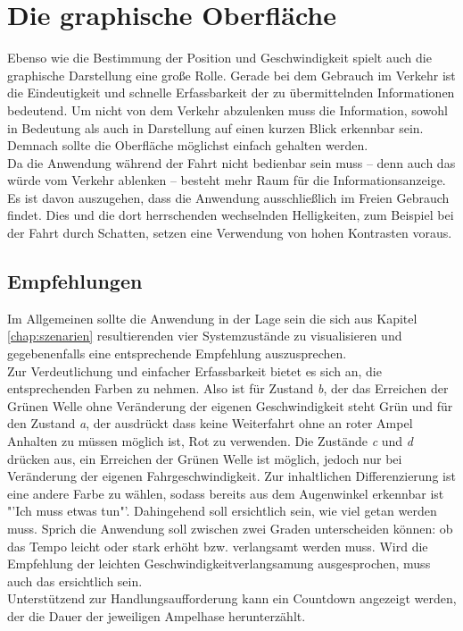 \section{Die graphische Oberfläche}
Ebenso wie die Bestimmung der Position und Geschwindigkeit spielt auch die graphische Darstellung eine große Rolle. Gerade bei dem Gebrauch im Verkehr ist die Eindeutigkeit und schnelle Erfassbarkeit der zu übermittelnden Informationen bedeutend. Um nicht von dem Verkehr abzulenken muss die Information, sowohl in Bedeutung als auch in Darstellung auf einen kurzen Blick erkennbar sein. Demnach sollte die Oberfläche möglichst einfach gehalten werden.\\
Da die Anwendung während der Fahrt nicht bedienbar sein muss -- denn auch das würde vom Verkehr ablenken -- besteht mehr Raum für die Informationsanzeige. 
Es ist davon auszugehen, dass die Anwendung ausschließlich im Freien Gebrauch findet. Dies und die dort herrschenden wechselnden Helligkeiten, zum Beispiel bei der Fahrt durch Schatten, setzen eine Verwendung von hohen Kontrasten voraus.
\subsection{Empfehlungen}
Im Allgemeinen sollte die Anwendung in der Lage sein die sich aus Kapitel \ref{chap:szenarien} resultierenden vier Systemzustände zu visualisieren und gegebenenfalls eine entsprechende Empfehlung auszusprechen.\\
Zur Verdeutlichung und einfacher Erfassbarkeit bietet es sich an, die entsprechenden Farben zu nehmen. Also ist für Zustand \textit{b}, der das Erreichen der Grünen Welle ohne Veränderung der eigenen Geschwindigkeit steht Grün und für den Zustand \textit{a}, der ausdrückt dass keine Weiterfahrt ohne an roter Ampel Anhalten zu müssen möglich ist, Rot zu verwenden.
Die Zustände \textit{c} und \textit{d} drücken aus, ein Erreichen der Grünen Welle ist möglich, jedoch nur bei Veränderung der eigenen Fahrgeschwindigkeit. Zur inhaltlichen Differenzierung ist eine andere Farbe zu wählen, sodass bereits aus dem Augenwinkel erkennbar ist "'Ich muss etwas tun"'. Dahingehend soll ersichtlich sein, wie viel getan werden muss. Sprich die Anwendung soll zwischen zwei Graden unterscheiden können: ob das Tempo leicht oder stark erhöht bzw. verlangsamt werden muss. Wird die Empfehlung der leichten Geschwindigkeitverlangsamung ausgesprochen, muss auch das ersichtlich sein.\\
Unterstützend zur Handlungsaufforderung kann ein Countdown angezeigt werden, der die Dauer der jeweiligen Ampelhase herunterzählt. 
